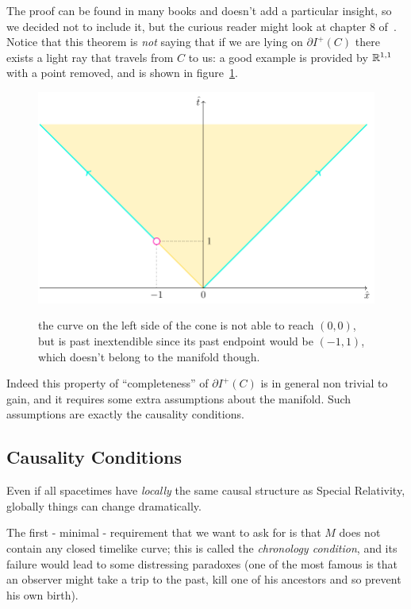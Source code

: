 The proof can be found in many books and doesn't add a particular insight, so we 
decided not to include it, but the curious reader might look at chapter \(8\) 
of~\cite{wald2010general}. 
Notice that this theorem is \emph{not} saying that if we are lying on \(\partial I^+(C)\) 
there exists a light ray that travels from \(C\) to us: a good example is provided by
\({\mathbb{R}}^{1,1}\) with a point removed, and is shown in figure~\ref{fig:inextendible-but-incomplete}.
\begin{figure}
	\centering
	\caption{the curve on the left side of the cone is not able to reach \((0,0)\), but
	is past inextendible since its past endpoint would be \((-1, 1)\), which doesn't belong
	to the manifold though.}
	\includegraphics[scale=0.7]{Immagini/inextendible-but-incomplete/inextendible-but-incomplete.pdf}
	\label{fig:inextendible-but-incomplete}
\end{figure}
Indeed this property of ``completeness'' of \(\partial I^+(C)\) is in general non trivial to gain, and it requires some extra assumptions about the manifold. Such assumptions are exactly the causality conditions.

\subsection{Causality Conditions}
Even if all spacetimes have \emph{locally} the same causal structure as Special Relativity, globally things can change dramatically.

The first - minimal - requirement that we want to ask for is that \(M\) does not contain any  closed timelike curve; this is called the \emph{chronology condition}, and its failure would lead to some distressing paradoxes (one of the most famous is that an observer might take a trip to the past, kill one of his ancestors and so prevent his own birth).

